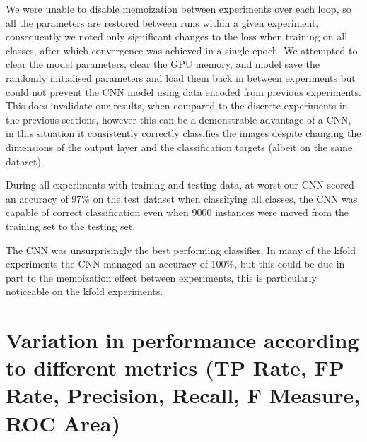 \documentclass[11pt]{article}
\begin{document}
We were unable to disable memoization between experiments over each loop, so all the parameters are restored between runs within a given experiment, consequently we noted only significant changes to the loss when training on all classes, after which convergence was achieved in a single epoch. We attempted to clear the model parameters, clear the GPU memory, and model save the randomly initialised parameters and load them back in between experiments but could not prevent the CNN model using data encoded from previous experiments. This does invalidate our results, when compared to the discrete experiments in the previous sections, however this can be a demonstrable advantage of a CNN, in this situation it consistently correctly classifies the images despite changing the dimensions of the output layer and the classification targets (albeit on the same dataset).


During all experiments with training and testing data, at worst our CNN scored an accuracy of 97\% on the test dataset when classifying all classes, the CNN was capable of correct classification even when 9000 instances were moved from the training set to the testing set.

The CNN was unsurprisingly the best performing classifier, In many of the kfold experiments the CNN managed an accuracy of 100\%, but this could be due in part to the memoization effect between experiments, this is particularly noticeable on the kfold experiments.


\newpage
\section{Variation in performance according to different metrics (TP Rate, FP Rate, Precision,
Recall, F Measure, ROC Area)}
\end{document}

